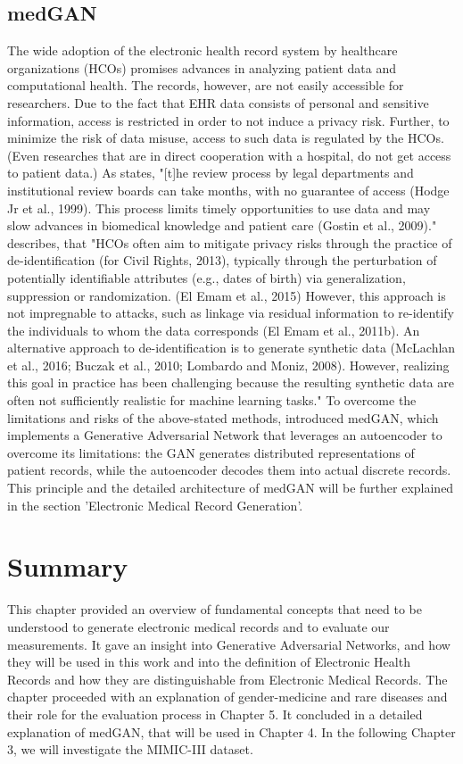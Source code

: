 \documentclass[11pt, a4paper]{book}
\begin{document}
\subsection{medGAN}
The wide adoption of the electronic health record system by healthcare organizations (HCOs) promises advances in analyzing patient data and computational health. The records, however, are not easily accessible for researchers. Due to the fact that EHR data consists of personal and sensitive information, access is restricted in order to not induce a privacy risk. Further, to minimize the risk of data misuse, access to such data is regulated by the HCOs. \cite{Choi2017}
(Even researches that are in direct cooperation with a hospital, do not get access to patient data.)
 As \cite{Choi2017} states, "[t]he review process by legal departments and institutional review boards can take months, with no guarantee of access (Hodge Jr et al., 1999). This process limits timely opportunities to use data and may slow advances in biomedical knowledge and patient care (Gostin et al., 2009)."
 \cite{Choi2017} describes, that "HCOs often aim to mitigate privacy risks through the practice of de-identification (for Civil Rights, 2013), typically through the perturbation of potentially identifiable attributes (e.g., dates of birth) via generalization, suppression or randomization. (El Emam et al., 2015) However, this approach is not impregnable to attacks, such as linkage via residual information to re-identify the individuals to whom the data corresponds (El Emam et al., 2011b). An alternative approach to de-identification is to generate synthetic data (McLachlan et al., 2016; Buczak et al., 2010; Lombardo and Moniz, 2008). However, realizing this goal in practice has been challenging because the resulting synthetic data are often not sufficiently realistic for machine learning tasks."  \cite{Choi2017}
 To overcome the limitations and risks of the above-stated methods, \cite{Choi2017} introduced medGAN, which implements a Generative Adversarial Network that leverages an autoencoder to overcome its limitations: the GAN generates distributed representations of patient records, while the autoencoder decodes them into actual discrete records.
 This principle and the detailed architecture of medGAN will be further explained in the section 'Electronic Medical Record Generation'.

\section{Summary}
This chapter provided an overview of fundamental concepts that need to be understood to generate electronic medical records and to evaluate our measurements.
It gave an insight into Generative Adversarial Networks, and how they will be used in this work and into the definition of Electronic Health Records and how they are distinguishable from Electronic Medical Records.
The chapter proceeded with an explanation of gender-medicine and rare diseases and their role for the evaluation process in Chapter 5. It concluded in a detailed explanation of medGAN, that will be used in Chapter 4. In the following Chapter 3, we will investigate the MIMIC-III dataset.
\end{document}
